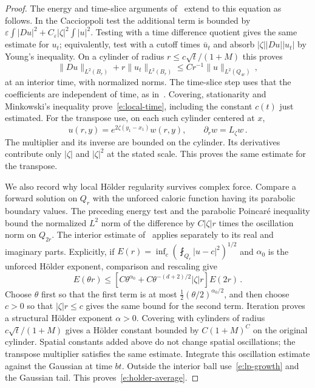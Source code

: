 \documentclass[11pt]{amsart}
\theoremstyle{definition}
\theoremstyle{remark}
\numberwithin{equation}{section}
\begin{document}
\begin{proof}
The energy and time-slice arguments of~\citet[Lemmas~8.1--8.2]{AKM2019book} extend to this equation as follows. In the Caccioppoli test the additional term is bounded by $\varepsilon\int|Du|^2+C_\varepsilon|\zeta|^2\int|u|^2$. Testing with a time difference quotient gives the same estimate for $u_t$; equivalently, test with a cutoff times $\bar u_t$ and absorb $|\zeta||Du||u_t|$ by Young's inequality. On a cylinder of radius $r\leq c\sqrt t/(1+M)$ this proves
\begin{equation*}
 \|Du\|_{L^2(B_r)}+r\|u_t\|_{L^2(B_r)}
 \leq Cr^{-1}\|u\|_{L^2(Q_{4r})}\, ,
\end{equation*}
at an interior time, with normalized norms. The time-slice step uses that the coefficients are independent of time, as in~\citet[(8.10)]{AKM2019book}. Covering, stationarity and Minkowski's inequality prove~\eqref{e:local-time}, including the constant $c(t)$ just estimated. For the transpose use, on each such cylinder centered at $x$,
\begin{equation*}
 u(r,y)=e^{2\zeta(y_1-x_1)}w(r,y),\qquad \partial_rw=L_\zeta w\, .
\end{equation*}
The multiplier and its inverse are bounded on the cylinder. Its derivatives contribute only $|\zeta|$ and $|\zeta|^2$ at the stated scale. This proves the same estimate for the transpose.

We also record why local H\"older regularity survives complex force. Compare a forward solution on $Q_r$ with the unforced caloric function having its parabolic boundary values. The preceding energy test and the parabolic Poincar\'e inequality bound the normalized $L^2$ norm of the difference by $C|\zeta|r$ times the oscillation norm on $Q_{2r}$. The interior estimate of~\citet[Proposition~E.3]{AKM2019book} applies separately to its real and imaginary parts. Explicitly, if $E(r)=\inf_c(\fint_{Q_r}|u-c|^2)^{1/2}$ and $\alpha_0$ is the unforced H\"older exponent, comparison and rescaling give
\begin{equation*}
 E(\theta r)\leq
 [C\theta^{\alpha_0}+C\theta^{-(d+2)/2}|\zeta|r]E(2r)\, .
\end{equation*}
Choose $\theta$ first so that the first term is at most $\tfrac12(\theta/2)^{\alpha_0/2}$, and then choose $c>0$ so that $|\zeta|r\leq c$ gives the same bound for the second term. Iteration proves a structural H\"older exponent $\alpha>0$. Covering with cylinders of radius $c\sqrt t/(1+M)$ gives a H\"older constant bounded by $C(1+M)^C$ on the original cylinder. Spatial constants added above do not change spatial oscillations; the transpose multiplier satisfies the same estimate. Integrate this oscillation estimate against the Gaussian at time $bt$. Outside the interior ball use~\eqref{e:lp-growth} and the Gaussian tail. This proves~\eqref{e:holder-average}.


\end{proof}
\end{document}
